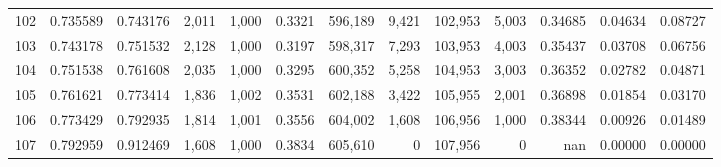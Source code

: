 \begin{tabular}{rrrrrrrrrrrrr}
102 &  0.735589 &  0.743176 &   2,011 &  1,000 &                                     0.3321 &  596,189 &    9,421 &  102,953 &    5,003 &  0.34685 &  0.04634 &  0.08727 \\
103 &  0.743178 &  0.751532 &   2,128 &  1,000 &                                     0.3197 &  598,317 &    7,293 &  103,953 &    4,003 &  0.35437 &  0.03708 &  0.06756 \\
104 &  0.751538 &  0.761608 &   2,035 &  1,000 &                                     0.3295 &  600,352 &    5,258 &  104,953 &    3,003 &  0.36352 &  0.02782 &  0.04871 \\
105 &  0.761621 &  0.773414 &   1,836 &  1,002 &                                     0.3531 &  602,188 &    3,422 &  105,955 &    2,001 &  0.36898 &  0.01854 &  0.03170 \\
106 &  0.773429 &  0.792935 &   1,814 &  1,001 &                                     0.3556 &  604,002 &    1,608 &  106,956 &    1,000 &  0.38344 &  0.00926 &  0.01489 \\
107 &  0.792959 &  0.912469 &   1,608 &  1,000 &                                     0.3834 &  605,610 &        0 &  107,956 &        0 &      nan &  0.00000 &  0.00000 \\
\bottomrule
\end{tabular}
